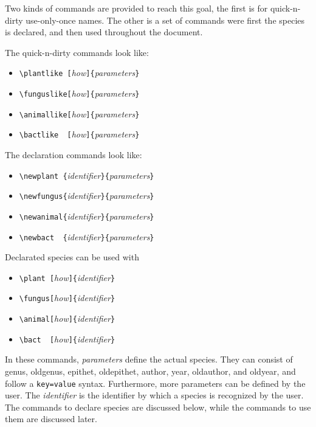 \documentclass{article}%
\begin{document}
Two kinds of commands are provided to reach this goal, the first is for quick-n-dirty use-only-once names. The other is a set of commands were first the species is declared, and then used throughout the document.

The quick-n-dirty commands look like:
\begin{itemize}
  \item\verb!\plantlike [!\textit{how}\verb!]{!\textit{parameters}\verb!}!
  \item\verb!\funguslike[!\textit{how}\verb!]{!\textit{parameters}\verb!}!
  \item\verb!\animallike[!\textit{how}\verb!]{!\textit{parameters}\verb!}!
  \item\verb!\bactlike  [!\textit{how}\verb!]{!\textit{parameters}\verb!}!
\end{itemize}

The declaration commands look like:
\begin{itemize}
  \item\verb!\newplant {!\textit{identifier}\verb!}{!\textit{parameters}\verb!}!
  \item\verb!\newfungus{!\textit{identifier}\verb!}{!\textit{parameters}\verb!}!
  \item\verb!\newanimal{!\textit{identifier}\verb!}{!\textit{parameters}\verb!}!
  \item\verb!\newbact  {!\textit{identifier}\verb!}{!\textit{parameters}\verb!}!
\end{itemize}

Declarated species can be used with
\begin{itemize}
  \item\verb!\plant [!\textit{how}\verb!]{!\textit{identifier}\verb!}!
  \item\verb!\fungus[!\textit{how}\verb!]{!\textit{identifier}\verb!}!
  \item\verb!\animal[!\textit{how}\verb!]{!\textit{identifier}\verb!}!
  \item\verb!\bact  [!\textit{how}\verb!]{!\textit{identifier}\verb!}!
\end{itemize}

In these commands, \textit{parameters} define the actual species. They can consist of genus, oldgenus, epithet, oldepithet, author, year, oldauthor, and oldyear, and follow a \verb!key=value! syntax. Furthermore, more parameters can be defined by the user. The \textit{identifier} is the identifier by which a species is recognized by the user. The commands to declare species are discussed below, while the commands to use them are discussed later.
\end{document}
